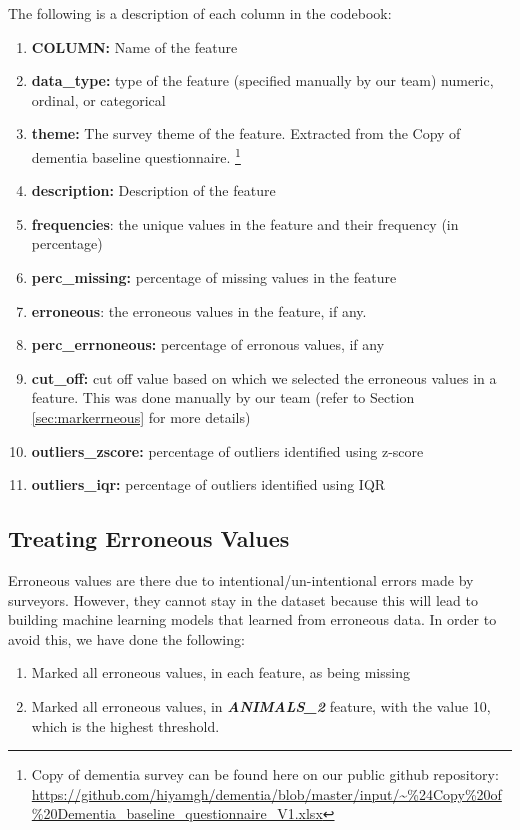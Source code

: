\documentclass{article}
\begin{document}
The following is a description of each column in the codebook:
\begin{enumerate}
\item \textbf{COLUMN:} Name of the feature
\item \textbf{data\_type:} type of the feature (specified manually by our team) numeric, ordinal, or categorical
\item \textbf{theme:} The survey theme of the feature. Extracted from the Copy of dementia baseline questionnaire. \footnote{Copy of dementia survey can be found here on our public github repository: \url{https://github.com/hiyamgh/dementia/blob/master/input/~\%24Copy\%20of\%20Dementia_baseline_questionnaire_V1.xlsx}\label{copyof_codebook}}
\item \textbf{description:} Description of the feature
\item \textbf{frequencies}: the unique values in the feature and their frequency (in percentage)
\item \textbf{perc\_missing:} percentage of missing values in the feature
\item \textbf{erroneous}: the erroneous values in the feature, if any.
\item \textbf{perc\_errnoneous:} percentage of erronous values, if any
\item \textbf{cut\_off:} cut off value based on which we selected the erroneous values in a feature. This was done manually by our team (refer to Section \ref{sec:markerrneous} for more details)
\item \textbf{outliers\_zscore:} percentage of outliers identified using z-score
\item \textbf{outliers\_iqr:} percentage of outliers identified using IQR 
\end{enumerate}

\subsection{Treating Erroneous Values}
Erroneous values are there due to intentional/un-intentional errors made by surveyors. However, they cannot stay in the dataset because this will lead to building machine learning models that learned from erroneous data. In order to avoid this, we have done the following:
\begin{enumerate}
\item Marked all erroneous values, in each feature, as being missing
\item Marked all erroneous values, in \textit{\textbf{ANIMALS\_2}} feature, with the value 10, which is the highest threshold.
\end{enumerate}
\end{document}
